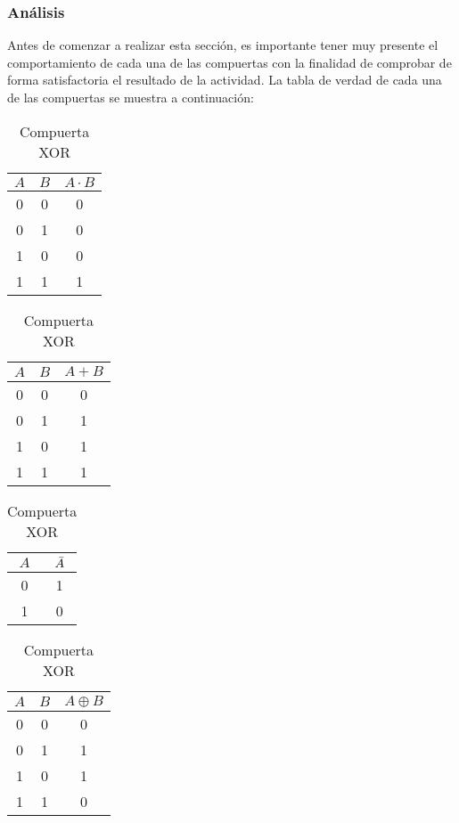 \documentclass[../procedimientos.tex]{subfiles}
\begin{document}
\subsubsection{Análisis}
Antes de comenzar a realizar esta sección, es importante tener muy presente el 
comportamiento de cada una de las compuertas con la finalidad de comprobar de 
forma satisfactoria el resultado de la actividad. La tabla de verdad de cada 
una de las compuertas se muestra a continuación:
\begin{table}[h!]
  \caption{Tablas de verdad (Sección A)}
  \label{tab:a_tv}
  \centering
  \begin{subtable}[t]{0.25\linewidth} %
    \centering
    \label{tab:comp_and}
    \begin{tabular}{|c c|c|}
      \hline
      $A$ & $B$ & $A \cdot B$\\
      \hline
      0 & 0 & 0\\
      0 & 1 & 0\\
      1 & 0 & 0\\
      1 & 1 & 1\\
      \hline
    \end{tabular}
    \caption{Compuerta AND}
  \end{subtable}
  \begin{subtable}[t]{0.25\linewidth} %
    \centering
    \label{tab:comp_or}
    \begin{tabular}{|c c|c|}
      \hline
      $A$ & $B$ & $A + B$\\
      \hline
      0 & 0 & 0\\
      0 & 1 & 1\\
      1 & 0 & 1\\
      1 & 1 & 1\\
      \hline
    \end{tabular}
    \caption{Compuerta OR}
  \end{subtable}
  \begin{subtable}[t]{0.20\linewidth} %
    \centering
    \label{tab:comp_not}
    \begin{tabular}{|c|c|}
      \hline
      $A$ & $\bar{A}$\\
      \hline
      0 & 1\\
      1 & 0\\
      \hline
    \end{tabular}
    \caption{Compuerta NOT}
  \end{subtable}
  \begin{subtable}[t]{0.25\linewidth} %
    \centering
    \label{tab:comp_xor}
    \begin{tabular}{|c c|c|}
      \hline
      $A$ & $B$ & $A \oplus B$\\
      \hline
      0 & 0 & 0\\
      0 & 1 & 1\\
      1 & 0 & 1\\
      1 & 1 & 0\\
      \hline
    \end{tabular}
    \caption{Compuerta XOR}
  \end{subtable}
\end{table}
\end{document}
